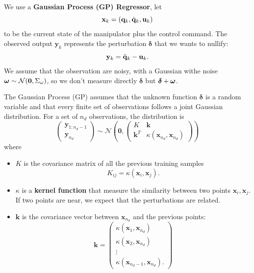 \documentclass[10pt, a4paper]{report}
\newcommand{\y}{{\mathbf y}}
\newcommand{\q}{{\mathbf q}}
\begin{document}
\noindent We use a \textbf{Gaussian Process (GP) Regressor}, let\begin{equation}
    \mathbf x_k=(\q_k,\dq_k,\mathbf u_k)
\end{equation}
to be the current state of the manipulator plus the control command. The observed output $\mathbf y_k$ represents the perturbation $\boldsymbol{\delta}$ that we wants to nullify:\begin{equation}
    \mathbf y_k={\ddot{\mathbf q}}_k-\mathbf u_k.
\end{equation}
We assume that the observation are noisy, with a Gaussian withe noise ${\boldsymbol{\omega}}\sim\mathcal N(\mathbf 0, \Sigma_\omega)$, so we don't measure directly $\boldsymbol{\delta}$ but $\boldsymbol{\delta}+{\boldsymbol{\omega}}$.\bigskip 

The Gaussian Process (GP) assumes that the unknown function $\boldsymbol{\delta}$ is a random variable and that every finite set of observations follows a joint Gaussian distribution. For a set of $n_d$ observations, the distribution is\begin{equation}
    \begin{pmatrix}
        \y_{1:n_d-1}\\ 
        \y_{n_d}
    \end{pmatrix}\sim \mathcal N\left(\mathbf 0,\begin{pmatrix}
        K& \mathbf k\\ \mathbf k^T& \kappa(\mathbf x_{n_d},\mathbf x_{n_d}) 
    \end{pmatrix} \right)
\end{equation}
where\begin{itemize}
    \item $K$ is the covariance matrix of all the previous training samples\begin{equation}
        K_{ij}=\kappa(\mathbf x_i,\mathbf x_j).
    \end{equation}
    \item $\kappa$ is a \textbf{kernel function} that measure the similarity between two points $\mathbf x_i,\mathbf x_j$. If two points are near, we expect that the perturbations are related.
    \item $\mathbf k$ is the covariance vector between $\mathbf x_{n_d}$ and the previous points:\begin{equation}
        \mathbf k=\begin{pmatrix}
            \kappa(\mathbf x_1,\mathbf x_{n_d})\\ 
            \kappa(\mathbf x_2,\mathbf x_{n_d})\\\vdots \\ 
            \kappa(\mathbf x_{n_d-1},\mathbf x_{n_d}).
        \end{pmatrix}
    \end{equation}
\end{itemize}
\end{document}

